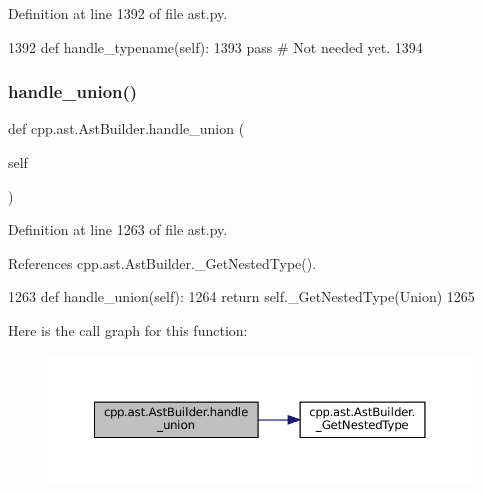 Definition at line 1392 of file ast.\+py.


\begin{DoxyCode}
1392     \textcolor{keyword}{def }handle\_typename(self):
1393         \textcolor{keywordflow}{pass}  \textcolor{comment}{# Not needed yet.}
1394 
\end{DoxyCode}
\mbox{\label{classcpp_1_1ast_1_1AstBuilder_a9b3fbfb21c6e23f04fd596d590f93eee}} 
\subsubsection{\texorpdfstring{handle\+\_\+union()}{handle\_union()}}
{\footnotesize\ttfamily def cpp.\+ast.\+Ast\+Builder.\+handle\+\_\+union (\begin{DoxyParamCaption}\item[{}]{self }\end{DoxyParamCaption})}



Definition at line 1263 of file ast.\+py.



References cpp.\+ast.\+Ast\+Builder.\+\_\+\+Get\+Nested\+Type().


\begin{DoxyCode}
1263     \textcolor{keyword}{def }handle\_union(self):
1264         \textcolor{keywordflow}{return} self.\_GetNestedType(Union)
1265 
\end{DoxyCode}
Here is the call graph for this function\+:
\nopagebreak
\begin{figure}[H]
\begin{center}
\leavevmode
\includegraphics[width=350pt]{classcpp_1_1ast_1_1AstBuilder_a9b3fbfb21c6e23f04fd596d590f93eee_cgraph}
\end{center}
\end{figure}
\mbox{\label{classcpp_1_1ast_1_1AstBuilder_a793123ea878db159de1662c10bdae897}} 
